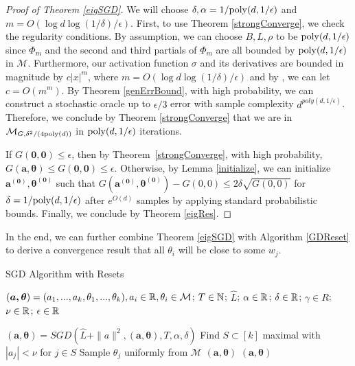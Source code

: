 \begin{proof}[Proof of Theorem \ref{eigSGD}]
We will choose $\delta, \alpha = 1/\mathrm{poly}(d,1/\epsilon)$ and $m = O(\log d \log (1/\delta)/\epsilon)$. First, to use Theorem \ref{strongConverge}, we check the regularity conditions. By assumption, we can choose $B, L, \rho$ to be $\mathrm{poly}(d,1/\epsilon)$ since $\Phi_m$ and the second and third partials of $\Phi_m$ are all bounded by $\mathrm{poly}(d,1/\epsilon)$ in $\mathcal{M}$. Furthermore, our activation function $\sigma$ and its derivatives are bounded in magnitude by $c|x|^{m}$, where $m = O(\log d \log (1/\delta)/\epsilon)$ and by \cite{Hermite}, we can let $c = O(m^m)$. By Theorem \ref{genErrBound}, with high probability, we can construct a stochastic oracle up to $\epsilon/3$ error with sample complexity $d^{poly(d,1/\epsilon)}$. Therefore, we conclude by Theorem \ref{strongConverge} that we are in $\mathcal{M}_{G,\delta^2/(4\mathrm{poly}(d))}$ in $\mathrm{poly}(d,1/\epsilon)$ iterations.

If $G(\boldsymbol{0,0}) \leq \epsilon$, then by Theorem~\ref{strongConverge}, with high probability, $G(\boldsymbol{a,\theta}) \leq G(\boldsymbol{0,0}) \leq \epsilon$. Otherwise, by Lemma \ref{initialize},  we can initialize $\boldsymbol{a^{(0)},\theta^{(0)}}$ such that $G(\boldsymbol{a^{(0)},\theta^{(0)}}) - G(0,0) \leq 2\delta \sqrt{G(0,0)}$ for $\delta = 1/\mathrm{poly}(d,1/\epsilon)$ after $e^{O(d)}$ samples by applying standard probabilistic bounds. Finally, we conclude by Theorem \ref{eigRes}.
\end{proof}
%


In the end, we can further combine Theorem \ref{eigSGD} with Algorithm \ref{GDReset} to derive a convergence result that all $\theta_i$ will be close to some $w_j$.
 
 \begin{algorithm}[tb]
 \caption{SGD Algorithm with Resets}
   \label{GDReset}
\begin{algorithmic}
  $(\boldsymbol{a,\theta}) = (a_1,...,a_k,\theta_1,...,\theta_k), a_i
  \in{\mathbb{R}}, \theta_i\in\mathcal{M}$;
  $T\in {\mathbb{N}}$; $\widehat{L}$; $\alpha\in {\mathbb{R}}$; $\delta \in {\mathbb{R}}$;
  $\gamma \in R$; $\nu \in {\mathbb{R}}$; $\epsilon \in {\mathbb{R}}$ \vspace{0.1in} 
  
   \REPEAT
  \STATE $(\boldsymbol{a},\boldsymbol{\theta}) = SGD \left(\widehat{L} + \|a\|^2, (\boldsymbol{a},\boldsymbol{\theta}),T, \alpha,\delta \right)$
  \STATE Find $S \subset [k]$ maximal with $|a_j| < \nu$ for $j \in S$
    \REPEAT \STATE Sample $\theta_j$
  uniformly from $\mathcal{M}$
    \ENDFOR
  \ELSE
   $(\boldsymbol{a}, \boldsymbol{\theta}) $
  \ENDIF
    $(\boldsymbol{a}, \boldsymbol{\theta}) $
   \end{algorithmic}
\end{algorithm}

